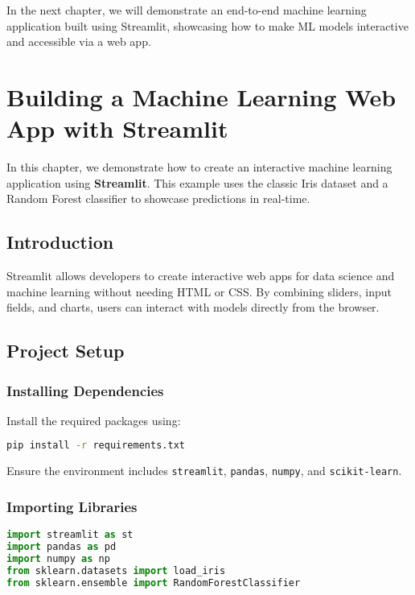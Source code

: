 In the next chapter, we will demonstrate an end-to-end machine learning application built using Streamlit, showcasing how to make ML models interactive and accessible via a web app.

\chapter{Building a Machine Learning Web App with Streamlit}

In this chapter, we demonstrate how to create an interactive machine learning application using \textbf{Streamlit}. This example uses the classic Iris dataset and a Random Forest classifier to showcase predictions in real-time.

\section{Introduction}

Streamlit allows developers to create interactive web apps for data science and machine learning without needing HTML or CSS. By combining sliders, input fields, and charts, users can interact with models directly from the browser.

\section{Project Setup}

\subsection{Installing Dependencies}

Install the required packages using:

\begin{lstlisting}[language=bash]
pip install -r requirements.txt
\end{lstlisting}

Ensure the environment includes \texttt{streamlit}, \texttt{pandas}, \texttt{numpy}, and \texttt{scikit-learn}.

\subsection{Importing Libraries}

\begin{lstlisting}[language=Python]
import streamlit as st
import pandas as pd
import numpy as np
from sklearn.datasets import load_iris
from sklearn.ensemble import RandomForestClassifier
\end{lstlisting}

